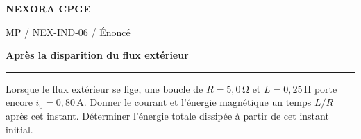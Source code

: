 \documentclass[11pt,a4paper]{article}
\begin{document}
{\small\bfseries\color{nexorablue} NEXORA CPGE}\par
{\small MP / NEX-IND-06 / Énoncé}\par
{\LARGE\bfseries Après la disparition du flux extérieur}\par
\vspace{0.25em}\hrule\vspace{0.6em}

Lorsque le flux extérieur se fige, une boucle de $R=5{,}0\,\mathrm\Omega$ et $L=0{,}25\,\mathrm H$ porte encore $i_0=0{,}80\,\mathrm A$. Donner le courant et l’énergie magnétique un temps $L/R$ après cet instant. Déterminer l’énergie totale dissipée à partir de cet instant initial.
\end{document}
